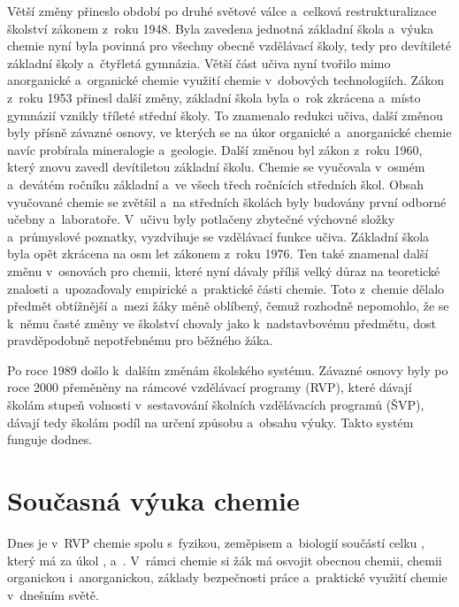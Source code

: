 Větší změny přineslo období po druhé světové válce a~celková restrukturalizace školství zákonem z~roku 1948. Byla zavedena jednotná základní škola a~výuka chemie nyní byla povinná pro všechny obecně vzdělávací školy, tedy pro devítileté základní školy a~čtyřletá gymnázia. Větší část učiva nyní tvořilo mimo anorganické a~organické chemie využití chemie v~dobových technologiích. Zákon z~roku 1953 přinesl další změny, základní škola byla o~rok zkrácena a~místo gymnázií vznikly tříleté střední školy. To znamenalo redukci učiva, další změnou byly přísně závazné osnovy, ve kterých se na úkor organické a~anorganické chemie navíc probírala mineralogie a~geologie. Další změnou byl zákon z~roku 1960, který znovu zavedl devítiletou základní školu. Chemie se vyučovala v~osmém a~devátém ročníku základní a~ve všech třech ročnících středních škol. Obsah vyučované chemie se zvětšil a~na středních školách byly budovány první odborné učebny a~laboratoře. V~učivu byly potlačeny zbytečné výchovné složky a~průmyslové poznatky, vyzdvihuje se vzdělávací funkce učiva. Základní škola byla opět zkrácena na osm let zákonem z~roku 1976. Ten také znamenal další změnu v~osnovách pro chemii, které nyní dávaly příliš velký důraz na teoretické znalosti a~upozaďovaly empirické a~praktické části chemie. Toto z~chemie dělalo předmět obtížnější a~mezi žáky méně oblíbený, čemuž rozhodně nepomohlo, že se k~němu časté změny ve školství chovaly jako k~nadstavbovému předmětu, dost pravděpodobně nepotřebnému pro běžného žáka. \cite{historie_vyuky} \cite{u_nas_v_zahranici}

Po roce 1989 došlo k~dalším změnám školského systému. Závazné osnovy byly po roce 2000 přeměněny na rámcové vzdělávací programy (RVP), které dávají školám stupeň volnosti v~sestavování školních vzdělávacích programů (ŠVP), dávají tedy školám podíl na určení způsobu a~obsahu výuky. Takto systém funguje dodnes. \cite{u_nas_v_zahranici}

\section{Současná výuka chemie}
Dnes je v~RVP chemie spolu s~fyzikou, zeměpisem a~biologií součástí celku , který má za úkol  \cite{rvp_g}, a~. \cite{rvp_zv} V~rámci chemie si žák má osvojit obecnou chemii, chemii organickou i~anorganickou, základy bezpečnosti práce a~praktické využití chemie v~dnešním světě. \cite{rvp_g} \cite{rvp_zv}


